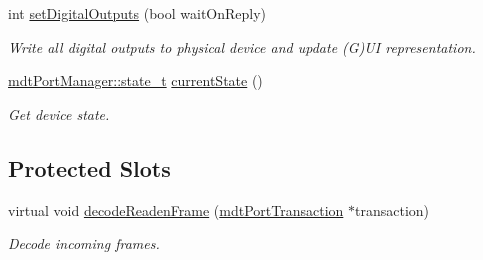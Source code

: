 \begin{DoxyCompactItemize}
\item 
int \hyperlink{classmdt_device_a7b86a816e55a91f0d62426e1741437c6}{set\-Digital\-Outputs} (bool wait\-On\-Reply)
\begin{DoxyCompactList}\small\item\em Write all digital outputs to physical device and update (G)U\-I representation. \end{DoxyCompactList}\item 
\hyperlink{classmdt_port_manager_a9448339d7f08ca5e18b904df25b382da}{mdt\-Port\-Manager\-::state\-\_\-t} \hyperlink{classmdt_device_a76ddf08ac78502b835b192a8f38f963f}{current\-State} ()
\begin{DoxyCompactList}\small\item\em Get device state. \end{DoxyCompactList}\end{DoxyCompactItemize}
\subsection*{Protected Slots}
\begin{DoxyCompactItemize}
\item 
virtual void \hyperlink{classmdt_device_ad211ba3be781c3db0397d5bf91f796d1}{decode\-Readen\-Frame} (\hyperlink{classmdt_port_transaction}{mdt\-Port\-Transaction} $\ast$transaction)
\begin{DoxyCompactList}\small\item\em Decode incoming frames. \end{DoxyCompactList}\end{DoxyCompactItemize}
